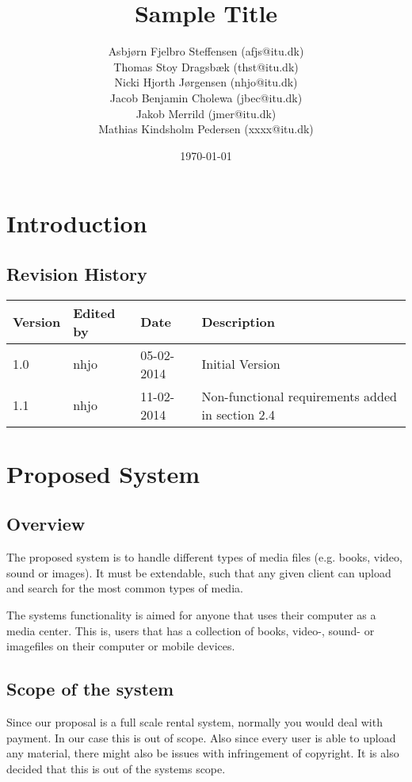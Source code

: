 \documentclass{report}
\title{Sample Title}
\date{\today}
\author{Asbj\o rn Fjelbro Steffensen (afjs@itu.dk)\\ Thomas Stoy Dragsb\ae k (thst@itu.dk)\\ Nicki Hjorth J\o rgensen (nhjo@itu.dk)\\ Jacob Benjamin Cholewa (jbec@itu.dk)\\ Jakob Merrild (jmer@itu.dk)\\ Mathias Kindsholm Pedersen (xxxx@itu.dk)}
\begin{document}
\maketitle
\newpage
\tableofcontents

\chapter{Introduction}

\section{Revision History}
\begin{center}
\begin{tabularx}{\textwidth}{|l|l|l|X|}
\hline
\textbf{Version} & \textbf{Edited by} & \textbf{Date} & \textbf{Description} \\
\hline
1.0 & nhjo & 05-02-2014 & Initial Version \\
\hline
1.1 & nhjo & 11-02-2014 & Non-functional requirements added in section 2.4 \\
\hline

\end{tabularx}
\end{center}



\chapter{Proposed System}

\section{Overview}
The proposed system is to handle different types of media files (e.g. books, video, sound or images). It must be extendable, such that any given client can upload and search for the most common types of media.

The systems functionality is aimed for anyone that uses their computer as a media center. This is, users that has a collection of books, video-, sound- or imagefiles on their computer or mobile devices.

\section{Scope of the system}

Since our proposal is a full scale rental system, normally you would deal with payment. In our case this is out of scope. Also since every user is able to upload any material, there might also be  issues with infringement of copyright. It is also decided that this is out of the systems scope.
\end{document}
